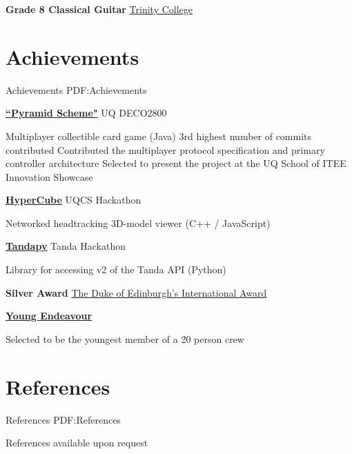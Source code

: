 \documentclass[a4paper,10pt,oneside]{article}
\begin{document}
\begin{body}

\textbf{Grade 8 Classical Guitar}
\href{http://www.trinitycollege.com/}{Trinity College}
\hfill {}






\section
{Achievements}
{Achievements}
{PDF:Achievements}


\href{https://github.com/UQdeco2800/deco2800-2016-pyramidscheme}{\textbf{``Pyramid Scheme"}} UQ DECO2800 \hfill {}
\begin{detail}
	\BulletItem Multiplayer collectible card game (Java)
	\BulletItem 3rd highest number of commits contributed
	\BulletItem Contributed the multiplayer protocol specification and primary controller architecture
	\BulletItem Selected to present the project at the UQ School of ITEE Innovation Showcase
\end{detail}

\EntryGap

\href{https://github.com/Chrischar/HyperCube}{\textbf{HyperCube}} UQCS Hackathon \hfill {}
\begin{detail}
Networked headtracking 3D-model viewer (C++ / JavaScript)
\end{detail}

\EntryGap

\href{https://github.com/Baralabite/Tandapy}{\textbf{Tandapy}} Tanda Hackathon \hfill {}
\begin{detail}
Library for accessing v2 of the Tanda API (Python)
\end{detail}

\EntryGap

\textbf{Silver Award}
\href{http://www.dukeofed.com.au/}{The Duke of Edinburgh’s International Award}
\hfill {}

\EntryGap

\href{https://www.youngendeavour.gov.au/}{\textbf{Young Endeavour}} \hfill {}
\begin{detail}
Selected to be the youngest member of a 20 person crew
\end{detail}

\section
{References}
{References}
{PDF:References}
\par References available upon request


\end{body}
\end{document}
